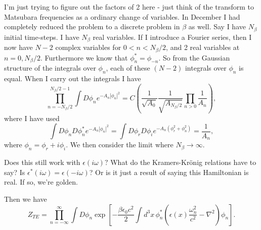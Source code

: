 \begin{shaded}
I'm just trying to figure out the factors of 2 here - just think of the transform to Matsubara 
frequencies as a ordinary change of variables.
  In December I had completely reduced the problem to a discrete problem in $\beta$ as well.
  Say I have $N_\beta$ initial time-steps.
  I have $N_\beta$ real variables.
  If I introduce a Fourier series, then I now have $N-2$ complex variables for $0<n<N_\beta/2$, and 2 real variables at $n=0, N_\beta/2$.
  Furthermore we know that $\phi_n^* = \phi_{-n}$.
  So from the Gaussian structure of the integrals over $\phi_n$, each of these $(N-2)$ integrals over $\phi_n$ is equal.
  When I carry out the integrals I have 
\begin{equation}
\prod_{n=-N_\beta/2}^{N_\beta/2-1}\int D\phi_n e^{-A_n|\phi_n|^2} 
= C\left( \frac{1}{\sqrt{A_0}}\frac{1}{\sqrt{A_{N_\beta/2}}}\prod_{n>0}\frac{1}{A_n}\right),
\end{equation}
where I have used 
\begin{equation}
\int D\phi_nD\phi_n^* e^{-A_n|\phi_n|^2} = \int D\phi_r D\phi_ie^{-A_n(\phi_r^2+\phi_n^2)} = \frac{1}{A_n}, 
\end{equation}
where $\phi_n = \phi_r + i \phi_i$.
  We then consider the limit where $N_\beta\rightarrow \infty$.  

Does this still work with $\epsilon(i\omega)?$  What do the Kramers-Kr\"onig relations have to say?
  Is $\epsilon^*(i\omega) = \epsilon(-i\omega)$?
  Or is it just a result of saying this Hamiltonian is real.
  If so, we're golden.  
\end{shaded}

Then we have 
\begin{equation}
Z_{TE} = \prod_{n=-\infty}^{\infty} \int D\phi_n\exp\left[ -\frac{\beta \epsilon_0 c^2 }{2}
\int d^3x\, \phi_n^*\left(\epsilon(x)\frac{\omega_n^2}{c^2} -\nabla^2\right)\phi_n\right] .
\end{equation}

